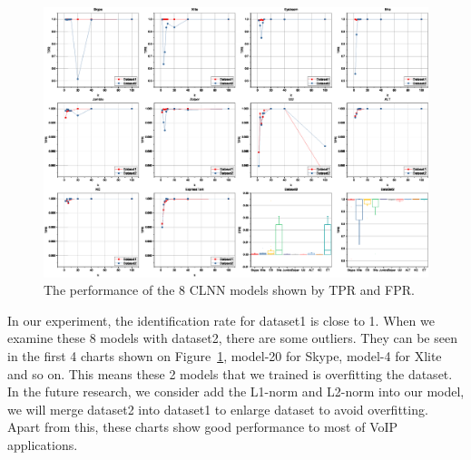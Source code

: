 \documentclass[conference]{IEEEtran}
\begin{document}
\begin{figure}[htp]
\begin{center}
\includegraphics[width=1\textwidth]{fprtpr-hpcc.eps}
\caption{The performance of the 8 CLNN models shown by TPR and FPR.}\label{fig:fprtpr}
\end{center}
\end{figure}

In our experiment, the identification rate for dataset1 is close to 1. When we examine these 8 models with dataset2, there are some outliers. They can be seen in the first 4 charts shown on Figure~\ref{fig:fprtpr}, model-20 for Skype, model-4 for Xlite and so on. This means these 2 models that we trained is overfitting the dataset. In the future research, we consider add the L1-norm and L2-norm into our model, we will merge dataset2 into dataset1 to enlarge dataset to avoid overfitting. Apart from this, these charts show good performance to most of VoIP applications.
\end{document}

